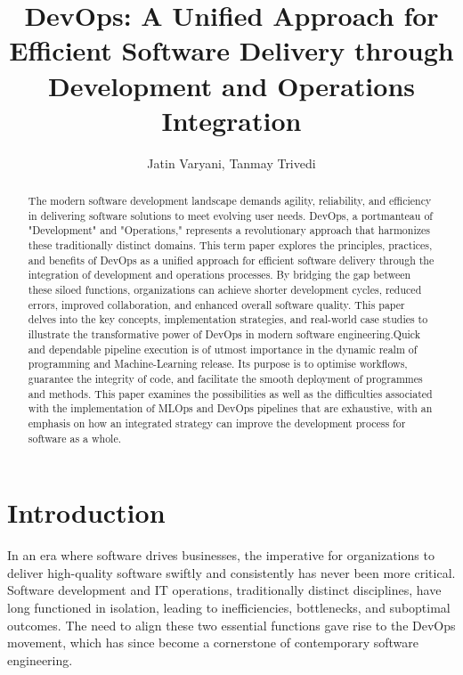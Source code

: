\documentclass[12pt, letterpaper]{article}
\title{DevOps: A Unified Approach for Efficient Software Delivery through Development and Operations Integration}
\author{Jatin Varyani, Tanmay Trivedi}
\begin{document}
\maketitle

\begin{abstract}
    The modern software development landscape demands agility, reliability, and efficiency in delivering software solutions to meet evolving user needs. DevOps, a portmanteau of "Development" and "Operations," represents a revolutionary approach that harmonizes these traditionally distinct domains. This term paper explores the principles, practices, and benefits of DevOps as a unified approach for efficient software delivery through the integration of development and operations processes\cite{Haris}. By bridging the gap between these siloed functions, organizations can achieve shorter development cycles, reduced errors, improved collaboration, and enhanced overall software quality. This paper delves into the key concepts, implementation strategies, and real-world case studies to illustrate the transformative power of DevOps in modern software engineering.Quick and dependable pipeline execution is of utmost importance in the dynamic realm of programming and Machine-Learning release\cite{Rajapakse}. Its purpose is to optimise workflows, guarantee the integrity of code, and facilitate the smooth deployment of programmes and methods. This paper examines the possibilities as well as the difficulties associated with the implementation of MLOps and DevOps pipelines that are exhaustive, with an emphasis on how an integrated strategy can improve the development process for software as a whole.
\end{abstract}

\section{Introduction}
In an era where software drives businesses, the imperative for organizations to deliver high-quality software swiftly and consistently has never been more critical\cite{THEUNISSEN2022106733}. Software development and IT operations, traditionally distinct disciplines, have long functioned in isolation, leading to inefficiencies, bottlenecks, and suboptimal outcomes. The need to align these two essential functions gave rise to the DevOps movement, which has since become a cornerstone of contemporary software engineering\cite{Ska}.
\end{document}
